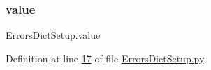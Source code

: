 \mbox{\label{namespace_errors_dict_setup_a4436d6af623cbe45d37493afe4de9461}} 
\subsubsection{\texorpdfstring{value}{value}}
{\footnotesize\ttfamily Errors\+Dict\+Setup.\+value}



Definition at line \mbox{\hyperlink{_errors_dict_setup_8py_source_l00017}{17}} of file \mbox{\hyperlink{_errors_dict_setup_8py_source}{Errors\+Dict\+Setup.\+py}}.


